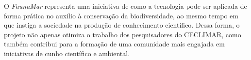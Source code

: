 O \textit{FaunaMar} representa uma iniciativa de como a tecnologia pode ser aplicada de forma prática no auxílio à conservação da biodiversidade, ao mesmo tempo em que instiga a sociedade na produção de conhecimento científico. Dessa forma, o projeto não apenas otimiza o trabalho dos pesquisadores do CECLIMAR, como também contribui para a formação de uma comunidade mais engajada em iniciativas de cunho científico e ambiental.